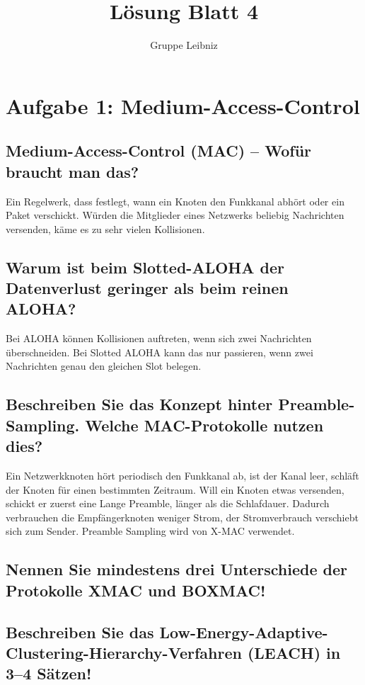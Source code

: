 \documentclass[11pt]{scrartcl}
\title{Lösung Blatt 4}
\author{Gruppe Leibniz}
\begin{document}
\maketitle

\section{Aufgabe 1: Medium-Access-Control}
\subsection{Medium-Access-Control (MAC) – Wofür braucht man das?}

Ein Regelwerk, dass festlegt, wann ein Knoten den Funkkanal abhört oder ein Paket verschickt.
Würden die Mitglieder eines Netzwerks beliebig Nachrichten versenden, käme es zu sehr vielen Kollisionen.

\subsection{Warum ist beim Slotted-ALOHA der Datenverlust geringer als beim reinen ALOHA?}

Bei ALOHA können Kollisionen auftreten, wenn sich zwei Nachrichten überschneiden.
Bei Slotted ALOHA kann das nur passieren, wenn zwei Nachrichten genau den gleichen Slot belegen.

\subsection{Beschreiben Sie das Konzept hinter Preamble-Sampling. Welche MAC-Protokolle nutzen dies?}

Ein Netzwerkknoten hört periodisch den Funkkanal ab, ist der Kanal leer, schläft der Knoten für einen bestimmten Zeitraum.
Will ein Knoten etwas versenden, schickt er zuerst eine Lange Preamble, länger als die Schlafdauer.
Dadurch verbrauchen die Empfängerknoten weniger Strom, der Stromverbrauch verschiebt sich zum Sender.
Preamble Sampling wird von X-MAC verwendet.

\subsection{Nennen Sie mindestens drei Unterschiede der Protokolle XMAC und BOXMAC!}



\subsection{Beschreiben Sie das Low-Energy-Adaptive-Clustering-Hierarchy-Verfahren (LEACH) in 3–4 Sätzen!}
\end{document}
